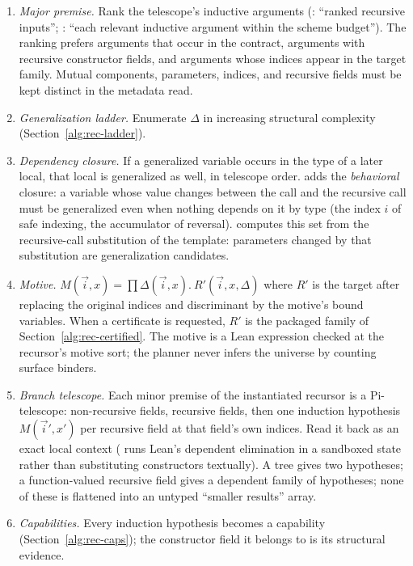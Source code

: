 \begin{enumerate}
\item \emph{Major premise.} Rank the telescope's inductive arguments (: ``ranked recursive inputs''; : ``each relevant inductive argument within the scheme budget''). The ranking prefers arguments that occur in the contract, arguments with recursive constructor fields, and arguments whose indices appear in the target family. Mutual components, parameters, indices, and recursive fields must be kept distinct in the metadata read.
\item \emph{Generalization ladder.} Enumerate $\Delta$ in increasing structural complexity (Section~\ref{alg:rec-ladder}).
\item \emph{Dependency closure.} If a generalized variable occurs in the type of a later local, that local is generalized as well, in telescope order.  adds the \emph{behavioral} closure: a variable whose value changes between the call and the recursive call must be generalized even when nothing depends on it by type (the index $i$ of safe indexing, the accumulator of reversal).  computes this set from the recursive-call substitution of the template: parameters changed by that substitution are generalization candidates.
\item \emph{Motive.} $M(\vec i, x) = \prod \Delta(\vec i, x).\ R'(\vec i, x, \Delta)$ where $R'$ is the target after replacing the original indices and discriminant by the motive's bound variables. When a certificate is requested, $R'$ is the packaged family of Section~\ref{alg:rec-certified}. The motive is a Lean expression checked at the recursor's motive sort; the planner never infers the universe by counting surface binders.
\item \emph{Branch telescope.} Each minor premise of the instantiated recursor is a Pi-telescope: non-recursive fields, recursive fields, then one induction hypothesis $M(\vec i', x')$ per recursive field at that field's own indices. Read it back as an exact local context ( runs Lean's dependent elimination in a sandboxed state rather than substituting constructors textually). A tree gives two hypotheses; a function-valued recursive field gives a dependent family of hypotheses; none of these is flattened into an untyped ``smaller results'' array.
\item \emph{Capabilities.} Every induction hypothesis becomes a capability (Section~\ref{alg:rec-caps}); the constructor field it belongs to is its structural evidence.

\end{enumerate}
